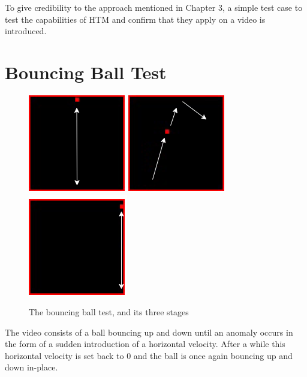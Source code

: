 To give credibility to the approach mentioned in Chapter 3, a simple test case to test the capabilities of HTM and confirm that they apply on a video is introduced.
\section{Bouncing Ball Test}

\begin{figure}[H]
    \centering
    \includegraphics[width=.3\textwidth]{resources/experiments/bouncing_ball/bb_updown1.png}\hfill
    \includegraphics[width=.3\textwidth]{resources/experiments/bouncing_ball/bb_updownside.png}\hfill
    \includegraphics[width=.3\textwidth]{resources/experiments/bouncing_ball/bb_updown2.png}
    \caption{The bouncing ball test, and its three stages}
    \label{fig:bb}
\end{figure}
The video consists of a ball bouncing up and down until an anomaly occurs in the form of a sudden introduction of a horizontal velocity. After a while this horizontal velocity is set back to 0 and the ball is once again bouncing up and down in-place.
